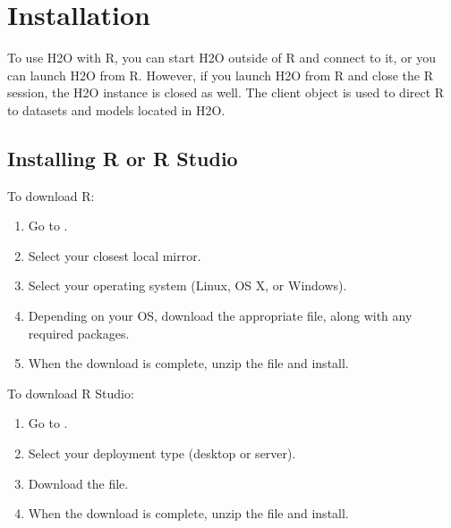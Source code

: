 \documentclass[11pt]{article}
\begin{document}
\section{Installation}

To use H2O with R, you can start H2O outside of R and connect to it, or you can launch H2O from R. However, if you launch H2O from R and close the R session, the H2O instance is closed as well. The client object is used to direct R to datasets and models located in H2O.

\subsection{Installing R or R Studio}

To download R:
\begin{enumerate}
\item Go to . 
\item Select your closest local mirror. 
\item Select your operating system (Linux, OS X, or Windows). 
\item Depending on your OS, download the appropriate file, along with any required packages. 
\item When the download is complete, unzip the file and install. \\
\end{enumerate}

To download R Studio: 

\begin{enumerate}
\item Go to . 
\item Select your deployment type (desktop or server). 
\item Download the file. 
\item When the download is complete, unzip the file and install.
\end{enumerate}
\end{document}
